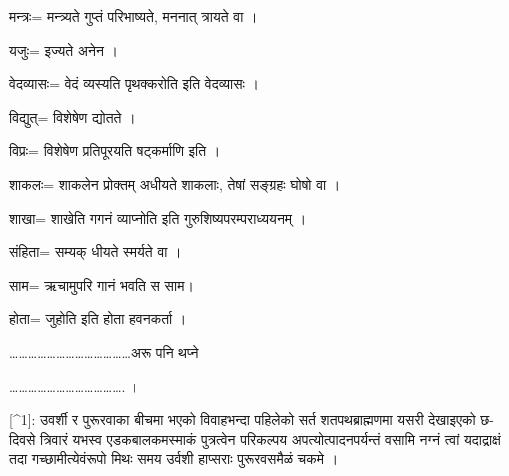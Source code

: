 \documentclass[11pt, a5paper]{article}
\begin{document}
मन्त्रः= मन्त्र्यते गुप्तं परिभाष्यते, मननात् त्रायते वा ।

यजुः= इज्यते अनेन ।

वेदव्यासः= वेदं व्यस्यति पृथक्करोति इति वेदव्यासः ।

विद्युत्= विशेषेण द्योतते ।

विप्रः= विशेषेण प्रतिपूरयति षट्‌कर्माणि इति ।

शाकलः= शाकलेन प्रोक्तम् अधीयते शाकलाः, तेषां सङ्‌ग्रहः घोषो वा ।

शाखा= शाखेति गगनं व्याप्नोति  इति गुरुशिष्यपरम्पराध्ययनम् ।

संहिता= सम्यक् धीयते स्मर्यते वा ।

साम= ऋचामुपरि गानं भवति स साम।

होता= जुहोति इति होता हवनकर्ता ।

…………………………………अरू पनि थप्ने

………………………………. ।

[^1]:   उवर्शी र पुरूरवाका बीचमा भएको विवाहभन्दा पहिलेको सर्त शतपथब्राह्मणमा यसरी देखाइएको छ- दिवसे त्रिवारं यभस्व एडकबालकमस्माकं पुत्रत्वेन परिकल्पय अपत्योत्पादनपर्यन्तं वसामि नग्नं त्वां यदाद्राक्षं तदा गच्छामीत्येवंरूपो मिथः समय उर्वशी हाप्सराः पुरूरवसमैळं चकमे ।
\end{document}

